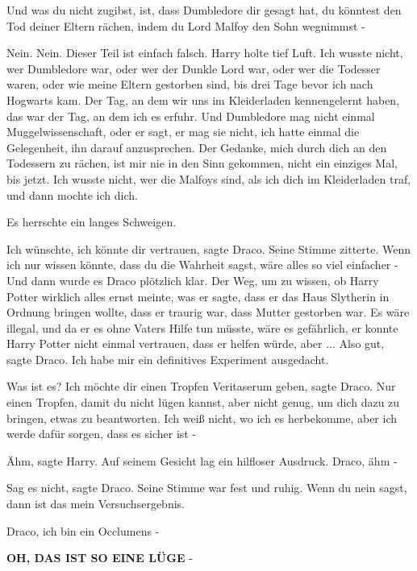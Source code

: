 \glqq{}Und was du nicht zugibst, ist, dass Dumbledore dir gesagt hat, du könntest
den Tod deiner Eltern rächen, indem du Lord Malfoy den Sohn wegnimmst -\grqq{}

\glqq{}Nein. Nein. Dieser Teil ist einfach falsch.\grqq{} Harry holte tief Luft.
\glqq{}Ich wusste nicht, wer Dumbledore war, oder wer der Dunkle Lord war, oder
wer die Todesser waren, oder wie meine Eltern gestorben sind, bis drei Tage
bevor ich nach Hogwarts kam. Der Tag, an dem wir uns im Kleiderladen
kennengelernt haben, das war der Tag, an dem ich es erfuhr. Und Dumbledore mag
nicht einmal Muggelwissenschaft, oder er sagt, er mag sie nicht, ich hatte
einmal die Gelegenheit, ihn darauf anzusprechen. Der Gedanke, mich durch dich an
den Todessern zu rächen, ist mir nie in den Sinn gekommen, nicht ein einziges
Mal, bis jetzt. Ich wusste nicht, wer die Malfoys sind, als ich dich im
Kleiderladen traf, und dann mochte ich dich.\grqq{}

Es herrschte ein langes Schweigen.

\glqq{}Ich wünschte, ich könnte dir vertrauen\grqq{}, sagte Draco. Seine Stimme
zitterte. \glqq{}Wenn ich nur wissen könnte, dass du die Wahrheit sagst, wäre
alles so viel einfacher -\grqq{} Und dann wurde es Draco plötzlich klar. Der
Weg, um zu wissen, ob Harry Potter wirklich alles ernst meinte, was er sagte,
dass er das Haus Slytherin in Ordnung bringen wollte, dass er traurig war, dass
Mutter gestorben war. Es wäre illegal, und da er es ohne Vaters Hilfe tun
müsste, wäre es gefährlich, er konnte Harry Potter nicht einmal vertrauen, dass
er helfen würde, aber ... \glqq{}Also gut\grqq{}, sagte Draco. \glqq{}Ich habe mir
ein definitives Experiment ausgedacht.\grqq{}

\glqq{}Was ist es?\grqq{} \glqq{}Ich möchte dir einen Tropfen Veritaserum
geben\grqq{}, sagte Draco. \glqq{}Nur einen Tropfen, damit du nicht lügen kannst,
aber nicht genug, um dich dazu zu bringen, etwas zu beantworten. Ich weiß nicht,
wo ich es herbekomme, aber ich werde dafür sorgen, dass es sicher ist -\grqq{}

\glqq{}Ähm\grqq{}, sagte Harry. Auf seinem Gesicht lag ein hilfloser Ausdruck.
\glqq{}Draco, ähm -\grqq{}

\glqq{}Sag es nicht\grqq{}, sagte Draco. Seine Stimme war fest und ruhig. \glqq{}
Wenn du nein sagst, dann ist das mein Versuchsergebnis.\grqq{}

\glqq{}Draco, ich bin ein Occlumens -\grqq{}

\glqq{}\textbf{OH, DAS IST SO EINE LÜGE} -\grqq{}

